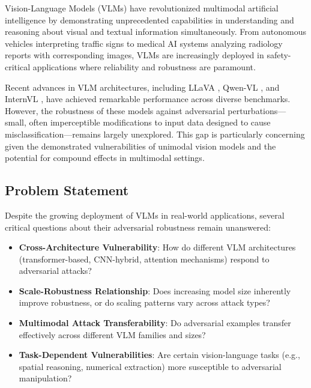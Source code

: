 \label{sec:introduction}

Vision-Language Models (VLMs) have revolutionized multimodal artificial intelligence by demonstrating unprecedented capabilities in understanding and reasoning about visual and textual information simultaneously. From autonomous vehicles interpreting traffic signs to medical AI systems analyzing radiology reports with corresponding images, VLMs are increasingly deployed in safety-critical applications where reliability and robustness are paramount.

Recent advances in VLM architectures, including LLaVA \cite{liu2023visual}, Qwen-VL \cite{bai2023qwen}, and InternVL \cite{chen2023internvl}, have achieved remarkable performance across diverse benchmarks. However, the robustness of these models against adversarial perturbations---small, often imperceptible modifications to input data designed to cause misclassification---remains largely unexplored. This gap is particularly concerning given the demonstrated vulnerabilities of unimodal vision models \cite{goodfellow2014explaining, madry2017towards} and the potential for compound effects in multimodal settings.

\subsection{Problem Statement}

Despite the growing deployment of VLMs in real-world applications, several critical questions about their adversarial robustness remain unanswered:

\begin{itemize}
    \item \textbf{Cross-Architecture Vulnerability}: How do different VLM architectures (transformer-based, CNN-hybrid, attention mechanisms) respond to adversarial attacks?
    \item \textbf{Scale-Robustness Relationship}: Does increasing model size inherently improve robustness, or do scaling patterns vary across attack types?
    \item \textbf{Multimodal Attack Transferability}: Do adversarial examples transfer effectively across different VLM families and sizes?
    \item \textbf{Task-Dependent Vulnerabilities}: Are certain vision-language tasks (e.g., spatial reasoning, numerical extraction) more susceptible to adversarial manipulation?
\end{itemize}

